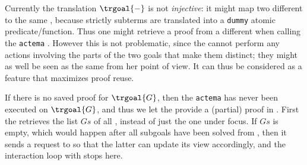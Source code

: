 \begin{remark}
  Currently the translation $\trgoal{-}$ is not \emph{injective}: it might
  map two different   to the same  ,
  because strictly  subterms are translated into a
  \texttt{dummy} atomic predicate/function. Thus one might retrieve a proof from
  a different  when calling the \texttt{actema} . However
  this is not problematic, since the  cannot perform any actions
  involving the parts of the two goals that make them distinct; they might as
  well be seen as the same  from her point of view. It can thus be
  considered as a feature that maximizes proof reuse.
\end{remark}

If there is no saved proof for $\trgoal{G}$, then the \texttt{actema}
 has never been executed on $\trgoal{G}$, and thus we let the
 provide a (partial) proof in . First the
 retrieves the list $Gs$ of all , instead of just
the one under focus. If $Gs$ is empty, which would happen after all subgoals
have been solved from , then it sends a  request to
 so that the latter can update its view accordingly, and the
interaction loop with  stops here.

